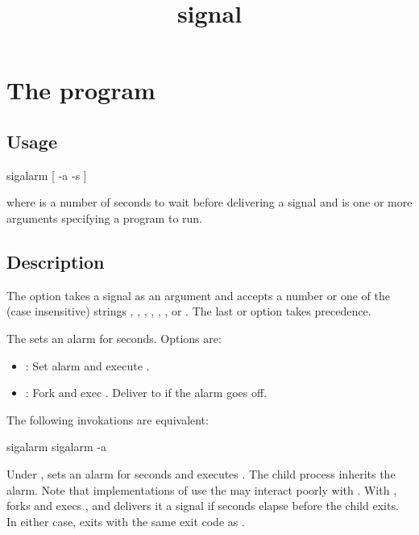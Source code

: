\documentclass{book}
\title{signal}
\begin{document}
\section{The  program}

\subsection{Usage}
\begin{code}%
  sigalarm [ -a -s  ]  
\end{code}
where  is a number of seconds to wait before delivering a signal
and  is one or more arguments specifying a program to run.

\subsection{Description}
The  option takes a signal as an argument and accepts a number or one of
the (case insensitive) strings , , , ,
, , or .  The last  or  option takes
precedence.

The  sets an alarm for  seconds.  Options are:
\begin{itemize}
\item {}: Set alarm and execute .
\item {}: Fork and exec .  Deliver  to 
      if the alarm goes off.
\end{itemize}
The following invokations are equivalent:
\begin{code}%
  sigalarm 
  sigalarm  -a 
\end{code}

Under ,  sets an alarm for  seconds and
executes .  The child process inherits the alarm.  Note that
implementations of  use the  may interact poorly with
.  With ,  forks and execs , and
delivers it a  signal if  seconds elapse before the child
exits.  In either case,  exits with the same exit code as
.
\end{document}
